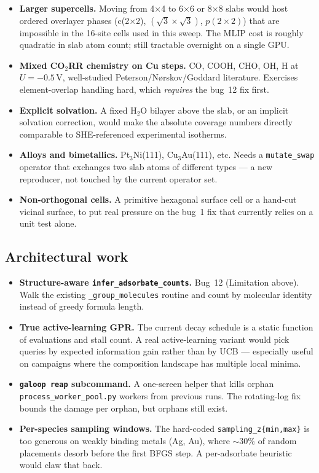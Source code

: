 \documentclass[11pt,letterpaper]{article}
\begin{document}
\begin{itemize}
  \item \textbf{Larger supercells.} Moving from 4$\times$4 to
    6$\times$6 or 8$\times$8 slabs would host ordered overlayer
    phases (c(2$\times$2), $(\sqrt{3}\times\sqrt{3})$, $p(2\times 2)$)
    that are impossible in the 16-site cells used in this sweep. The
    MLIP cost is roughly quadratic in slab atom count; still
    tractable overnight on a single GPU.
  \item \textbf{Mixed CO$_2$RR chemistry on Cu steps.} CO, COOH, CHO,
    OH, H at $U=-0.5$\,V, well-studied Peterson/N{\o}rskov/Goddard
    literature. Exercises element-overlap handling hard, which
    \emph{requires} the bug~12 fix first.
  \item \textbf{Explicit solvation.} A fixed H$_2$O bilayer above the
    slab, or an implicit solvation correction, would make the
    absolute coverage numbers directly comparable to SHE-referenced
    experimental isotherms.
  \item \textbf{Alloys and bimetallics.} Pt$_3$Ni(111),
    Cu$_3$Au(111), etc. Needs a \texttt{mutate\_swap} operator that
    exchanges two slab atoms of different types — a new reproducer,
    not touched by the current operator set.
  \item \textbf{Non-orthogonal cells.} A primitive hexagonal surface
    cell or a hand-cut vicinal surface, to put real pressure on the
    bug~1 fix that currently relies on a unit test alone.
\end{itemize}

\subsection{Architectural work}

\begin{itemize}
  \item \textbf{Structure-aware
    \texttt{infer\_adsorbate\_counts}.} Bug~12 (Limitation above).
    Walk the existing \texttt{\_group\_molecules} routine and count
    by molecular identity instead of greedy formula length.
  \item \textbf{True active-learning GPR.} The current decay
    schedule is a static function of evaluations and stall count.
    A real active-learning variant would pick queries by expected
    information gain rather than by UCB — especially useful on
    campaigns where the composition landscape has multiple local
    minima.
  \item \textbf{\texttt{galoop reap} subcommand.} A one-screen
    helper that kills orphan \texttt{process\_worker\_pool.py}
    workers from previous runs. The rotating-log fix bounds the
    damage per orphan, but orphans still exist.
  \item \textbf{Per-species sampling windows.} The hard-coded
    \texttt{sampling\_z\{min,max\}} is too generous on weakly
    binding metals (Ag, Au), where $\sim$30\% of random placements
    desorb before the first BFGS step. A per-adsorbate heuristic
    would claw that back.
\end{itemize}
\end{document}
